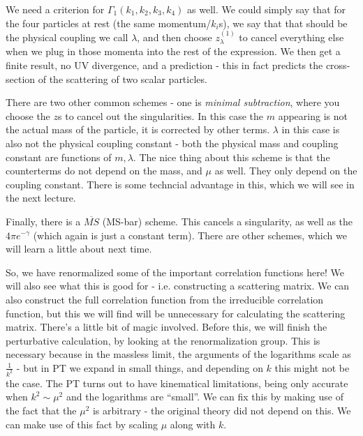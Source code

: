 We need a criterion for $\Gamma_1(k_1, k_2, k_3, k_4)$ as well. We could simply say that for the four particles at rest (the same momentum/$k_i$s), we say that that should be the physical coupling we call $\lambda$, and then choose $z_\lambda^{(1)}$ to cancel everything else when we plug in those momenta into the rest of the expression. We then get a finite result, no UV divergence, and a prediction - this in fact predicts the cross-section of the scattering of two scalar particles.

There are two other common schemes - one is \emph{minimal subtraction}, where you choose the $z$s to cancel out the singularities. In this case the $m$ appearing is not the actual mass of the particle, it is corrected by other terms. $\lambda$ in this case is also not the physical coupling constant - both the physical mass and coupling constant are functions of $m, \lambda$. The nice thing about this scheme is that the counterterms do not depend on the mass, and $\mu$ as well. They only depend on the coupling constant. There is some techncial advantage in this, which we will see in the next lecture.

Finally, there is a $\overline{MS}$ (MS-bar) scheme. This cancels a singularity, as well as the $4\pi e^{-\gamma}$ (which again is just a constant term). There are other schemes, which we will learn a little about next time.

So, we have renormalized some of the important correlation functions here! We will also see what this is good for - i.e. constructing a scattering matrix. We can also construct the full correlation function from the irreducible correlation function, but this we will find will be unnecessary for calculating the scattering matrix. There's a little bit of magic involved. Before this, we will finish the perturbative calculation, by looking at the renormalization group. This is necessary because in the massless limit, the arguments of the logarithms scale as $\frac{1}{k^2}$ - but in PT we expand in small things, and depending on $k$ this might not be the case. The PT turns out to have kinematical limitations, being only accurate when $k^2 \sim \mu^2$ and the logarithms are ``small''. We can fix this by making use of the fact that the $\mu^2$ is arbitrary - the original theory did not depend on this. We can make use of this fact by scaling $\mu$ along with $k$. 